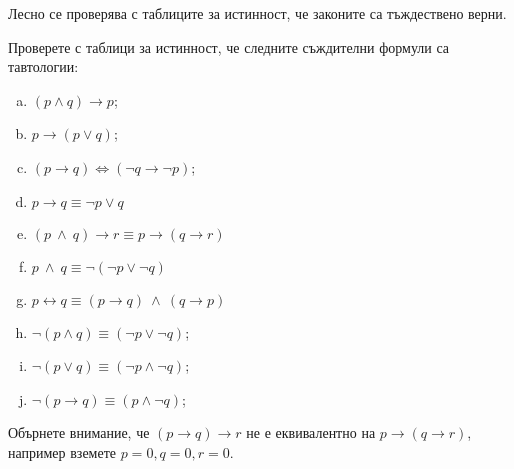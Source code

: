 Лесно се проверява с таблиците за истинност, че законите са тъждествено верни.

\begin{problem}
  Проверете с таблици за истинност, че следните съждителни формули са тавтологии:
  \begin{enumerate}[a)]
  \item
    $(p\wedge q)\rightarrow p$;
  \item
    $p\rightarrow(p\vee q)$;
  \item
    $(p\rightarrow q) \iff (\neg q \rightarrow \neg p)$;
  \item
    $p\rightarrow q \equiv \neg p \vee q$
  \item
    $(p\ \wedge\ q) \rightarrow r \equiv p \rightarrow (q\rightarrow r)$
  \item
    $p\ \wedge\ q \equiv \neg(\neg p \vee \neg q)$
  \item
    $p \leftrightarrow q \equiv (p\rightarrow q)\ \wedge\ (q\rightarrow p)$
  \item
    $\neg(p\wedge q) \equiv (\neg p \vee \neg q)$;
  \item
    $\neg(p\vee q) \equiv (\neg p \wedge \neg q)$;
  \item
    $\neg(p\rightarrow q) \equiv (p\wedge \neg q)$;
\end{enumerate}
\end{problem}

Обърнете внимание, че $(p\rightarrow q)\rightarrow r$ не е еквивалентно на $p\rightarrow (q\rightarrow r)$, например
вземете $p = 0, q = 0, r = 0$.

